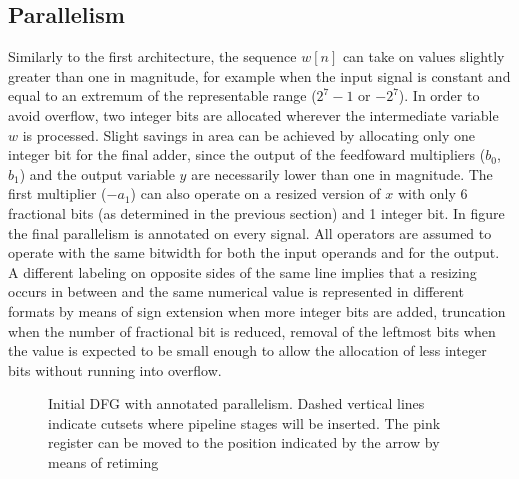 \subsection{Parallelism}
Similarly to the first architecture, the sequence $w[n]$ can take on values slightly greater than one in magnitude, for example when the input signal is constant and equal to an extremum of the representable range ($2^{7}-1$ or $-2^{7}$). In order to avoid overflow, two integer bits are allocated wherever the intermediate variable $w$ is processed. Slight savings in area can be achieved by allocating only one integer bit for the final adder, since the output of the feedfoward multipliers ($b_0$, $b_1$) and the output variable $y$ are necessarily lower than one in magnitude. The first multiplier ($-a_1$) can also operate on a resized version of $x$ with only 6 fractional bits (as determined in the previous section) and 1 integer bit. In figure  the final parallelism is annotated on every signal. All operators are assumed to operate with the same bitwidth for both the input operands and for the output.  A different labeling on opposite sides of the same line implies that a resizing occurs in between and the same numerical value is represented in different formats by means of sign extension when more integer bits are added, truncation when the number of fractional bit is reduced, removal of the leftmost bits when the value is expected to be small enough to allow the allocation of less integer bits without running into overflow.
\begin{figure}
	\caption{Initial DFG with annotated parallelism. Dashed vertical lines indicate cutsets where pipeline stages will be inserted. The pink register
		can be moved to the position indicated by the arrow by means of retiming}
	\label{fig:fast_dfg_inter}
\end{figure}


